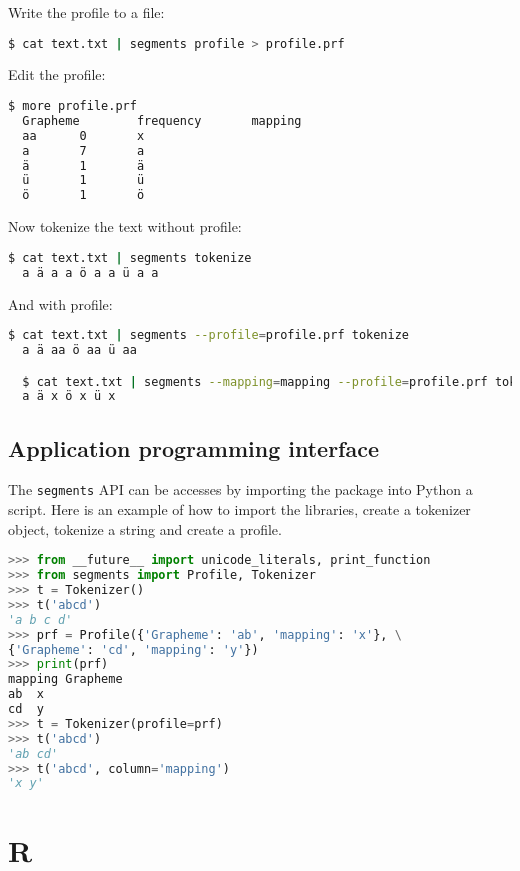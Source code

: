 \noindent Write the profile to a file:

\begin{lstlisting}[language=bash]
  $ cat text.txt | segments profile > profile.prf
\end{lstlisting}

\noindent Edit the profile:

\begin{lstlisting}[language=bash]
  $ more profile.prf
  Grapheme        frequency       mapping
  aa      0       x
  a       7       a
  ä       1       ä
  ü       1       ü
  ö       1       ö
\end{lstlisting}

\noindent Now tokenize the text without profile:

\begin{lstlisting}[language=bash]
  $ cat text.txt | segments tokenize
  a ä a a ö a a ü a a	
\end{lstlisting}

\noindent And with profile:
\begin{lstlisting}[language=bash]
  $ cat text.txt | segments --profile=profile.prf tokenize
  a ä aa ö aa ü aa

  $ cat text.txt | segments --mapping=mapping --profile=profile.prf tokenize
  a ä x ö x ü x
\end{lstlisting}


\subsection*{Application programming interface}
The \texttt{segments} API can be accesses by importing 
the package into Python a script. Here is an example of 
how to import the libraries, create a tokenizer object, 
tokenize a string and create a profile.

\begin{lstlisting}[language=python]
>>> from __future__ import unicode_literals, print_function
>>> from segments import Profile, Tokenizer
>>> t = Tokenizer()
>>> t('abcd')
'a b c d'
>>> prf = Profile({'Grapheme': 'ab', 'mapping': 'x'}, \
{'Grapheme': 'cd', 'mapping': 'y'})
>>> print(prf)
mapping Grapheme
ab  x
cd  y
>>> t = Tokenizer(profile=prf)
>>> t('abcd')
'ab cd'
>>> t('abcd', column='mapping')
'x y'
\end{lstlisting}


\section{R}
\label{r-implementation}

